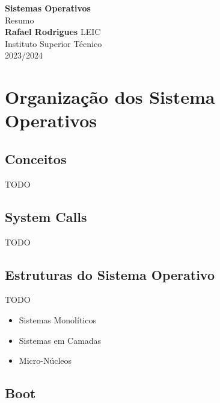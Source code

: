 \documentclass[11pt]{article}
\begin{document}
\begin{titlepage}
    \centering
    \vspace*{4cm}
    \textbf{\LARGE Sistemas Operativos} \\[0.5cm]
    \Large Resumo \\[2cm]
    \textbf{Rafael Rodrigues} \vfill
    LEIC \\ Instituto Superior Técnico \\ 2023/2024
\end{titlepage}

\tableofcontents

\setlength\parskip{1em plus 0.1em minus 0.2em}
\setlength{\parindent}{0pt}

\newpage

\section{Organização dos Sistema Operativos}

\subsection{Conceitos}

TODO

\subsection{System Calls}

TODO

\subsection{Estruturas do Sistema Operativo}

TODO

\begin{itemize}
    \item Sistemas Monolíticos
    \item Sistemas em Camadas
    \item Micro-Núcleos
\end{itemize}

\subsection{Boot}
\end{document}
